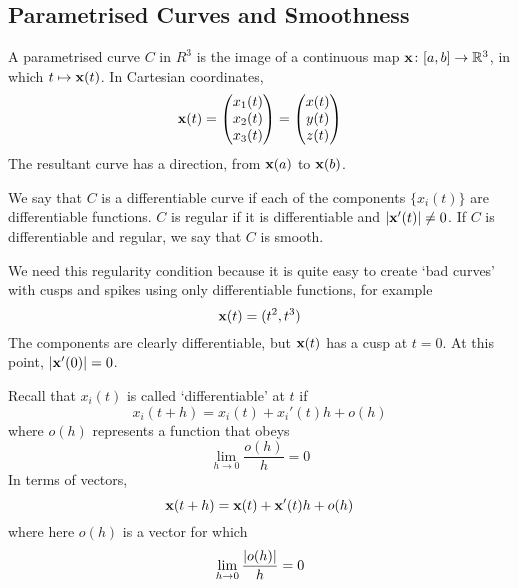 \documentclass{article}
\begin{document}
\subsection{Parametrised Curves and Smoothness}
A parametrised curve $C$ in $R^3$ is the image of a continuous map $\vb x \colon [a, b] \to \mathbb R^3$, in which $t \mapsto \vb x(t)$. In Cartesian coordinates,
\[ \vb x(t) = \begin{pmatrix}
		x_1(t) \\ x_2(t) \\ x_3(t)
	\end{pmatrix} = \begin{pmatrix}
		x(t) \\ y(t) \\ z(t)
	\end{pmatrix} \]
The resultant curve has a direction, from $\vb x(a)$ to $\vb x(b)$.
\begin{definition}
	We say that $C$ is a differentiable curve if each of the components $\{x_i(t)\}$ are differentiable functions. $C$ is regular if it is differentiable and $\abs{\vb x'(t)} \neq 0$. If $C$ is differentiable and regular, we say that $C$ is smooth.
\end{definition}
\begin{note}
	We need this regularity condition because it is quite easy to create `bad curves' with cusps and spikes using only differentiable functions, for example
	\[ \vb x(t) = (t^2, t^3) \]
	The components are clearly differentiable, but $\vb x(t)$ has a cusp at $t = 0$. At this point, $\abs{\vb x'(0)} = 0$.
\end{note}
\begin{definition}
	Recall that $x_i(t)$ is called `differentiable' at $t$ if
	\[ x_i(t+h) = x_i(t) + x_i'(t)h + o(h) \]
	where $o(h)$ represents a function that obeys
	\[ \lim_{h \to 0} \frac{o(h)}{h} = 0 \]
	In terms of vectors,
	\[ \vb x(t+h) = \vb x(t) + \vb x'(t)h + o(h) \]
	where here $o(h)$ is a vector for which
	\[ \lim_{h \to 0} \frac{\abs{o(h)}}{h} = 0 \]
\end{definition}
\end{document}
